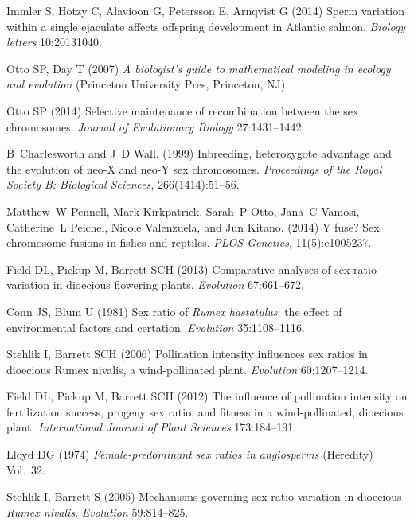 \begin{thebibliography}{20}
Immler S, Hotzy C, Alavioon G, Petersson E, Arnqvist G
 (2014) {Sperm variation within a single ejaculate affects offspring
  development in Atlantic salmon}.
 \textit{Biology letters} 10:20131040.

Otto SP, Day T
 (2007) \textit{{A biologist's guide to mathematical modeling in ecology
  and evolution}}
 (Princeton University Pres, Princeton, NJ).

Otto SP
 (2014) {Selective maintenance of recombination between the sex
  chromosomes.}
 \textit{Journal of Evolutionary Biology} 27:1431--1442.
 
B~Charlesworth and J~D Wall. (1999)
{Inbreeding, heterozygote advantage and the evolution of neo-X and
  neo-Y sex chromosomes}.
\textit{Proceedings of the Royal Society B: Biological Sciences},
  266(1414):51--56.
 
Matthew~W Pennell, Mark Kirkpatrick, Sarah~P Otto, Jana~C Vamosi, Catherine~L
  Peichel, Nicole Valenzuela, and Jun Kitano.
(2014) {Y fuse? Sex chromosome fusions in fishes and reptiles}.
\textit{PLOS Genetics}, 11(5):e1005237.

Field DL, Pickup M, Barrett SCH
 (2013) {Comparative analyses of sex-ratio variation in dioecious
  flowering plants.}
 \textit{Evolution} 67:661--672.

Conn JS, Blum U
 (1981) {Sex ratio of \textit{Rumex hastatulus}: the effect of
  environmental factors and certation}.
 \textit{Evolution} 35:1108--1116.

Stehlik I, Barrett SCH
 (2006) {Pollination intensity influences sex ratios in dioecious
  Rumex nivalis, a wind-pollinated plant.}
 \textit{Evolution} 60:1207--1214.

Field DL, Pickup M, Barrett SCH
 (2012) {The influence of pollination intensity on fertilization
  success, progeny sex ratio, and fitness in a wind-pollinated, dioecious
  plant}.
 \textit{International Journal of Plant Sciences} 173:184--191.

Lloyd DG
 (1974) \textit{{Female-predominant sex ratios in angiosperms}}
 (Heredity) Vol.{}~32.

Stehlik I, Barrett S
 (2005) {Mechanisms governing sex-ratio variation in dioecious
  \textit{Rumex nivalis}}.
 \textit{Evolution} 59:814--825.


\end{thebibliography}

